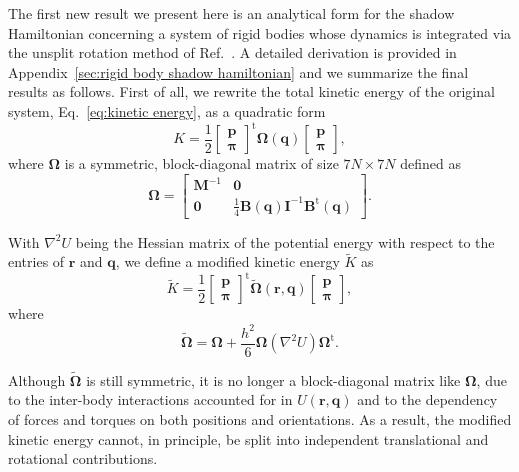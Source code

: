 \documentclass[
journal=jctcce,
layout=twocolumn
]{achemso}
\newcommand{\mt}[1]{\boldsymbol{\mathbf{#1}}}   %
\newcommand{\vt}[1]{\boldsymbol{\mathbf{#1}}}   %
\newcommand{\tr}[1]{#1^\text{t}}                %
\newcommand{\timestep}{h}
\newcommand{\modified}[1]{\widetilde{#1}}
\begin{document}
The first new result we present here is an analytical form for the shadow Hamiltonian concerning a system of rigid bodies whose dynamics is integrated via the unsplit rotation method of Ref.~.
A detailed derivation is provided in Appendix~\ref{sec:rigid body shadow hamiltonian} and we summarize the final results as follows.
First of all, we rewrite the total kinetic energy of the original system, Eq.~\eqref{eq:kinetic energy}, as a quadratic form
\begin{equation*}
K = \frac{1}{2} \tr{ \left[\begin{array}{c} \vt p \\ \vt \pi \end{array}\right]} {\mt \Omega}(\vt q) \left[\begin{array}{c} \vt p \\ \vt \pi \end{array}\right],
\end{equation*}
where $\mt \Omega$ is a symmetric, block-diagonal matrix of size $7N \times 7N$ defined as
\begin{equation*}
{\mt \Omega} = \left[\begin{array}{cc}
{\mt M}^{-1} & \mt 0 \\
\mt 0 & \frac{1}{4} {\mt B}(\vt q) {\mt I}^{-1} \tr{\mt B}(\vt q)
\end{array}\right].
\end{equation*}

With $\nabla^2 U$ being the Hessian matrix of the potential energy with respect to the entries of $\vt r$ and $\vt q$, we define a modified kinetic energy $\modified K$ as
\begin{equation*}
\modified K = \frac{1}{2} \tr{ \left[\begin{array}{c} \vt p \\ \vt \pi \end{array}\right]} \modified{\mathbf \Omega}(\vt r, \vt q) \left[\begin{array}{c} \vt p \\ \vt \pi \end{array}\right],
\end{equation*}
where
\begin{equation*}
\modified{\mathbf \Omega} = {\mt \Omega} + \frac{\timestep^2}{6} {\mt \Omega} (\nabla^2 U) \tr{\mt \Omega}.
\end{equation*}

Although $\modified{\mathbf \Omega}$ is still symmetric, it is no longer a block-diagonal matrix like $\mt \Omega$, due to the inter-body interactions accounted for in $U(\vt r, \vt q)$ and to the dependency of forces and torques on both positions and orientations.
As a result, the modified kinetic energy cannot, in principle, be split into independent translational and rotational contributions.
\end{document}
